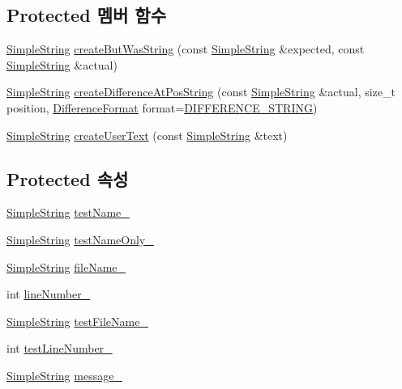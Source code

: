 \subsection*{Protected 멤버 함수}
\begin{DoxyCompactItemize}
\item 
\hyperlink{class_simple_string}{Simple\+String} \hyperlink{class_test_failure_a14e11a7282409ba8fb985ab58c983856}{create\+But\+Was\+String} (const \hyperlink{class_simple_string}{Simple\+String} \&expected, const \hyperlink{class_simple_string}{Simple\+String} \&actual)
\item 
\hyperlink{class_simple_string}{Simple\+String} \hyperlink{class_test_failure_a61d48c22fc7e93fe35b7d2c596c3a39e}{create\+Difference\+At\+Pos\+String} (const \hyperlink{class_simple_string}{Simple\+String} \&actual, size\+\_\+t position, \hyperlink{class_test_failure_aaadecd271c82449768993cbf919de0a2}{Difference\+Format} format=\hyperlink{class_test_failure_aaadecd271c82449768993cbf919de0a2a1246a1a469970104212c9113e3f057c9}{D\+I\+F\+F\+E\+R\+E\+N\+C\+E\+\_\+\+S\+T\+R\+I\+NG})
\item 
\hyperlink{class_simple_string}{Simple\+String} \hyperlink{class_test_failure_ae67765ada519d8a163922f50099a0016}{create\+User\+Text} (const \hyperlink{class_simple_string}{Simple\+String} \&text)
\end{DoxyCompactItemize}
\subsection*{Protected 속성}
\begin{DoxyCompactItemize}
\item 
\hyperlink{class_simple_string}{Simple\+String} \hyperlink{class_test_failure_afb42d7601608c3597c5279ddaf87e9d6}{test\+Name\+\_\+}
\item 
\hyperlink{class_simple_string}{Simple\+String} \hyperlink{class_test_failure_a60a0b2466b44483497e83d73b70241f2}{test\+Name\+Only\+\_\+}
\item 
\hyperlink{class_simple_string}{Simple\+String} \hyperlink{class_test_failure_a58b6159b0aa3b9775be67920baef742c}{file\+Name\+\_\+}
\item 
int \hyperlink{class_test_failure_ab83f5a7389dae9b8045aa6fbf55b153a}{line\+Number\+\_\+}
\item 
\hyperlink{class_simple_string}{Simple\+String} \hyperlink{class_test_failure_a19c231b59846532ec9d7ac8725886d67}{test\+File\+Name\+\_\+}
\item 
int \hyperlink{class_test_failure_abb1f7af8e12fc84b16898aa5b410ba2a}{test\+Line\+Number\+\_\+}
\item 
\hyperlink{class_simple_string}{Simple\+String} \hyperlink{class_test_failure_af95aeab689fdb637c3e94b0c10db3e53}{message\+\_\+}
\end{DoxyCompactItemize}


